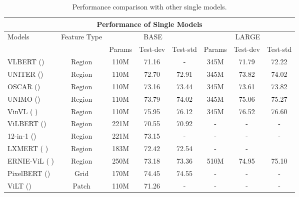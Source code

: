 \begin{table}[b]
\setlength{\tabcolsep}{0.6mm}
\caption{Performance comparison with other single models.} \label{tab:single_results}
\centering
\begin{tabular}{lc|ccc|ccc}
\toprule
\multicolumn{8}{c}{Performance of Single Models}                                                                                           \\
\midrule
\multirow{2}{*}{Models}                             & \multirow{2}{*}{Feature Type} & \multicolumn{3}{c|}{BASE}     & \multicolumn{3}{c}{LARGE}    \\
                                                    &                        & Params & Test-dev & Test-std & Params & Test-dev & Test-std \\
\midrule
VLBERT (\cite{su2019vl})           & Region                 & 110M   & 71.16    & -        & 345M   & 71.79    & 72.22    \\
UNITER (\cite{chen2020uniter})     & Region                 & 110M   & 72.70    & 72.91    & 345M   & 73.82    & 74.02    \\
OSCAR (\cite{li2020oscar})         & Region                 & 110M   & 73.16    & 73.44    & 345M   & 73.61    & 73.82    \\
UNIMO (\cite{li2020unimo})         & Region                 & 110M   & 73.79    & 74.02    & 345M   & 75.06    & 75.27    \\
VinVL (\cite{zhang2021vinvl} )     & Region                 & 110M   & 75.95    & 76.12    & 345M   & 76.52    & 76.60    \\
ViLBERT (\cite{lu2019vilbert})     & Region                 & 221M   & 70.55    & 70.92    & -      & -        & -        \\
12-in-1 (\cite{Lu_2020_CVPR})    & Region                 & 221M   & 73.15    & -        & -      & -        & -        \\
LXMERT (\cite{tan2019lxmert}  )    & Region                 & 183M   & 72.42    & 72.54    & -      & -        &          \\
ERNIE-ViL (\cite{yu2021ernie} )    & Region                 & 250M   & 73.18    & 73.36    & 510M   & 74.95    & 75.10    \\
PixelBERT (\cite{huang2020pixel}) & Grid                   & 170M   & 74.45    & 74.55    & -      & -        & -        \\
ViLT (\cite{kim2021vilt}) & Patch                   & 110M   & 71.26   & -    & -      & -        & -        \\

\end{tabular}
\end{table}
